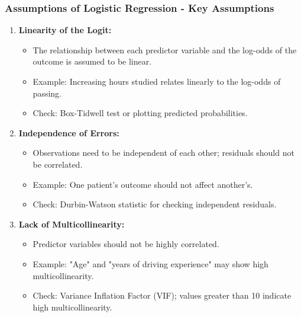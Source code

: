 \documentclass[aspectratio=169]{beamer}
\begin{document}
\begin{frame}[fragile]
    \frametitle{Assumptions of Logistic Regression - Key Assumptions}
    \begin{enumerate}
        \item \textbf{Linearity of the Logit:}
        \begin{itemize}
            \item The relationship between each predictor variable and the log-odds of the outcome is assumed to be linear.
            \item Example: Increasing hours studied relates linearly to the log-odds of passing.
            \item Check: Box-Tidwell test or plotting predicted probabilities.
        \end{itemize}
        
        \item \textbf{Independence of Errors:}
        \begin{itemize}
            \item Observations need to be independent of each other; residuals should not be correlated.
            \item Example: One patient's outcome should not affect another's.
            \item Check: Durbin-Watson statistic for checking independent residuals.
        \end{itemize}
        
        \item \textbf{Lack of Multicollinearity:}
        \begin{itemize}
            \item Predictor variables should not be highly correlated.
            \item Example: "Age" and "years of driving experience" may show high multicollinearity.
            \item Check: Variance Inflation Factor (VIF); values greater than 10 indicate high multicollinearity.
        \end{itemize}
    \end{enumerate}
\end{frame}
\end{document}
